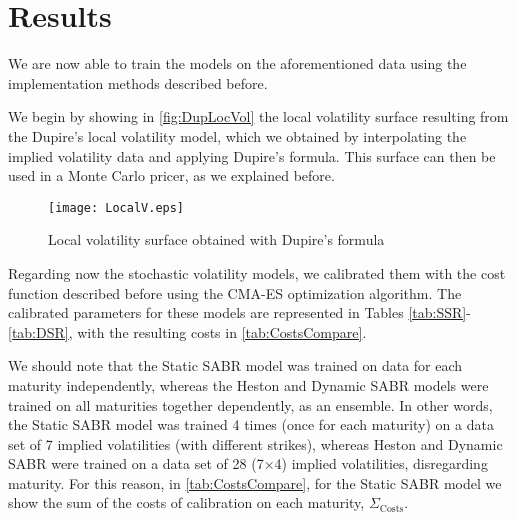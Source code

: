 
\section{Results}
\label{sec:resul}
We are now able to train the models on the aforementioned data using the implementation methods described before.

We begin by showing in \autoref{fig:DupLocVol} the local volatility surface resulting from the Dupire's local volatility model, which we obtained by interpolating the implied volatility data and applying Dupire's formula. This surface can then be used in a Monte Carlo pricer, as we explained before.


\begin{figure}[H]
    \centering
      \texttt{[image: LocalV.eps]}
      \caption{Local volatility surface obtained with Dupire's formula}\label{fig:DupLocVol}
    \end{figure}
    
    
Regarding now the stochastic volatility models, we calibrated them with the cost function described before using the CMA-ES optimization algorithm. The calibrated parameters for these models are represented in Tables \ref{tab:SSR}-\ref{tab:DSR}, with the resulting costs in \autoref{tab:CostsCompare}.
 
We should note that the Static SABR model was trained on data for each maturity independently, whereas the Heston and Dynamic SABR models were trained on all maturities together dependently, as an ensemble. In other words, the Static SABR model was trained 4 times (once for each maturity) on a data set of 7 implied volatilities (with different strikes), whereas Heston and Dynamic SABR were trained on a data set of 28 (7$\times$4) implied volatilities, disregarding maturity. For this reason, in \autoref{tab:CostsCompare}, for the Static SABR model we show the sum of the costs of calibration on each maturity, $\Sigma_{\mathrm{Costs}}$.

